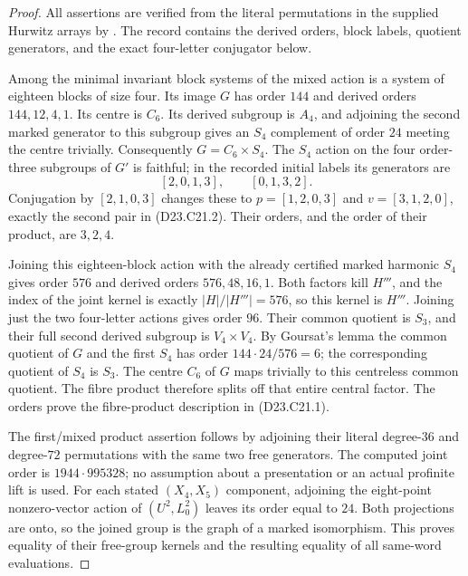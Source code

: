 \begin{proof}
All assertions are verified from the literal permutations
in the supplied Hurwitz arrays by
.
The record
contains the derived orders, block labels, quotient generators,
and the exact four-letter conjugator below.

Among the minimal invariant block systems of the mixed action
is a system of eighteen blocks of size four. Its image $G$
has order $144$ and derived orders $144,12,4,1$.
Its centre is $C_6$. Its derived subgroup is $A_4$, and adjoining
the second marked generator to this subgroup gives an $S_4$
complement of order $24$ meeting the centre trivially.
Consequently $G=C_6\times S_4$.
The $S_4$ action on the four order-three subgroups of $G'$ is
faithful; in the recorded initial labels its generators are
\[
             [2,0,1,3],\qquad[0,1,3,2].
\]
Conjugation by $[2,1,0,3]$ changes these to
$p=[1,2,0,3]$ and $v=[3,1,2,0]$, exactly the second pair
in (D23.C21.2). Their orders, and the order of their product,
are $3,2,4$.

Joining this eighteen-block action with the already certified
marked harmonic $S_4$ gives order $576$ and derived orders
$576,48,16,1$. Both factors kill $H'''$, and the index of
the joint kernel is exactly $|H|/|H'''|=576$, so this kernel
is $H'''$. Joining just the two four-letter actions gives
order $96$. Their common quotient is $S_3$, and their full
second derived subgroup is $V_4\times V_4$. By Goursat's lemma
the common quotient of $G$ and the first $S_4$ has order
$144\cdot24/576=6$; the corresponding quotient of $S_4$
is $S_3$. The centre $C_6$ of $G$ maps trivially to this
centreless common quotient. The fibre product therefore
splits off that entire central factor. The orders prove
the fibre-product description in (D23.C21.1).

The first/mixed product assertion follows by adjoining their
literal degree-$36$ and degree-$72$ permutations with the
same two free generators. The computed joint order is
$1944\cdot995328$; no assumption about a presentation or an
actual profinite lift is used.
For each stated $(X_4,X_5)$ component, adjoining the eight-point
nonzero-vector action of $(U^2,L_0^2)$ leaves its order equal
to $24$. Both projections are onto, so the joined group is
the graph of a marked isomorphism. This proves equality of
their free-group kernels and the resulting equality of all
same-word evaluations.
\end{proof}


